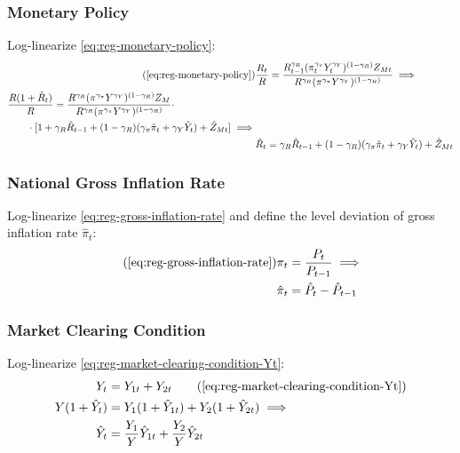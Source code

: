 \documentclass[../thesis.tex]{subfiles}
\begin{document}

\subsubsection*{Monetary Policy}

Log-linearize \ref{eq:reg-monetary-policy}:
\begin{align}
	\tag{\ref{eq:reg-monetary-policy}}
	& \frac{R_{t}}{R} = \frac{R_{t-1}^{\gamma_R} (\pi_t^{\gamma_\pi} Y_{t}^{\gamma_Y})^{(1-\gamma_R)} Z_{Mt}}{R^{\gamma_R} (\pi^{\gamma_\pi} Y^{\gamma_Y})^{(1-\gamma_R)}} \implies \\
	\begin{split}
		& \frac{R(1+ \hat{R}_t)}{R} = \frac{ R^{\gamma_R} (\pi^{\gamma_\pi} Y^{\gamma_Y})^{(1-\gamma_R)} Z_{M}}{R^{\gamma_R} (\pi^{\gamma_\pi} Y^{\gamma_Y})^{(1-\gamma_R)}} \cdot \\
		& \qquad \cdot [1+ \gamma_R \hat{R}_{t-1} + (1-\gamma_R)(\gamma_\pi \hat{\pi}_t + \gamma_Y \hat{Y}_t) + \hat{Z}_{Mt}] \implies
	\end{split} \nonumber \\
	& \hat{R}_t = \gamma_R \hat{R}_{t-1} + (1-\gamma_R)(\gamma_\pi \hat{\pi}_t + \gamma_Y \hat{Y}_t) + \hat{Z}_{Mt} \label{eq:reg-ll-monetary-policy}
\end{align}


\subsubsection*{National Gross Inflation Rate}

Log-linearize \ref{eq:reg-gross-inflation-rate} and define the level deviation of gross inflation rate $\hat{\pi}_t$:
\begin{align}
	\tag{\ref{eq:reg-gross-inflation-rate}}
	\pi_{t} &= \frac{P_{t}}{P_{t-1}} \implies \\
	\hat{\pi}_{t} &= \hat{P}_{t} - \hat{P}_{t-1}
	\label{eq:reg-level-dev-gross-inflation-rate}
\end{align}


\subsubsection*{Market Clearing Condition}

Log-linearize \ref{eq:reg-market-clearing-condition-Yt}:
\begin{alignat}{2}
	Y_{t} &= Y_{1 t} + Y_{2 t} \tag{\ref{eq:reg-market-clearing-condition-Yt}} \\
	Y (1 +\hat{Y}_{t}) &= Y_{1} (1 +\hat{Y}_{1t}) + Y_{2} (1 +\hat{Y}_{2t}) \implies \nonumber \\
	\hat{Y}_{t} &= \frac{Y_{1}}{Y} \hat{Y}_{1t} + \frac{Y_{2}}{Y} \hat{Y}_{2t} \label{eq:reg-ll-market-clearing-condition-Yt-2}
\end{alignat}
\end{document}
